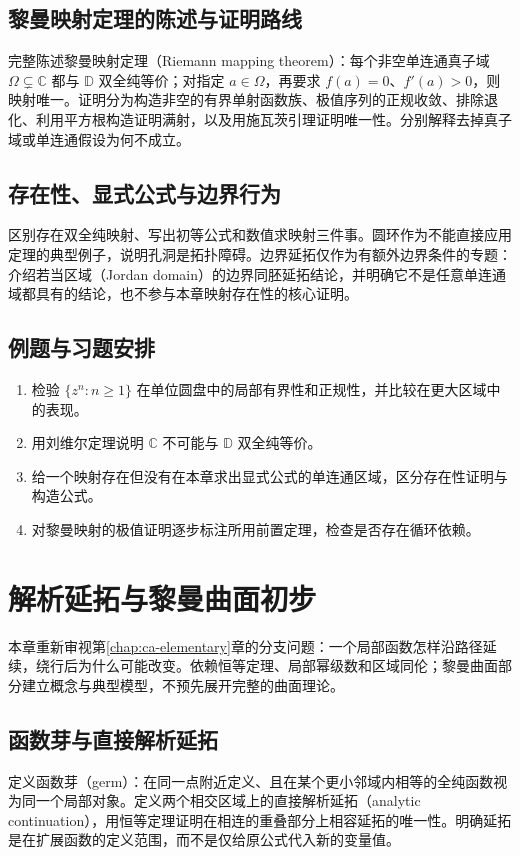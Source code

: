 \documentclass[UTF8,12pt,a4paper,fontset=fandol]{ctexbook}
\begin{document}
\section{黎曼映射定理的陈述与证明路线}
完整陈述黎曼映射定理（Riemann mapping theorem）：每个非空单连通真子域 $\Omega\subsetneq\mathbb{C}$ 都与 $\mathbb{D}$ 双全纯等价；对指定 $a\in\Omega$，再要求 $f(a)=0$、$f'(a)>0$，则映射唯一。证明分为构造非空的有界单射函数族、极值序列的正规收敛、排除退化、利用平方根构造证明满射，以及用施瓦茨引理证明唯一性。分别解释去掉真子域或单连通假设为何不成立。

\section{存在性、显式公式与边界行为}
区别存在双全纯映射、写出初等公式和数值求映射三件事。圆环作为不能直接应用定理的典型例子，说明孔洞是拓扑障碍。边界延拓仅作为有额外边界条件的专题：介绍若当区域（Jordan domain）的边界同胚延拓结论，并明确它不是任意单连通域都具有的结论，也不参与本章映射存在性的核心证明。

\section{例题与习题安排}
\begin{enumerate}
  \item 检验 $\{z^n:n\ge1\}$ 在单位圆盘中的局部有界性和正规性，并比较在更大区域中的表现。
  \item 用刘维尔定理说明 $\mathbb{C}$ 不可能与 $\mathbb{D}$ 双全纯等价。
  \item 给一个映射存在但没有在本章求出显式公式的单连通区域，区分存在性证明与构造公式。
  \item 对黎曼映射的极值证明逐步标注所用前置定理，检查是否存在循环依赖。
\end{enumerate}

\chapter{解析延拓与黎曼曲面初步}
\label{chap:ca-continuation}

本章重新审视第\ref{chap:ca-elementary}章的分支问题：一个局部函数怎样沿路径延续，绕行后为什么可能改变。依赖恒等定理、局部幂级数和区域同伦；黎曼曲面部分建立概念与典型模型，不预先展开完整的曲面理论。

\section{函数芽与直接解析延拓}
定义函数芽（germ）：在同一点附近定义、且在某个更小邻域内相等的全纯函数视为同一个局部对象。定义两个相交区域上的直接解析延拓（analytic continuation），用恒等定理证明在相连的重叠部分上相容延拓的唯一性。明确延拓是在扩展函数的定义范围，而不是仅给原公式代入新的变量值。
\end{document}
